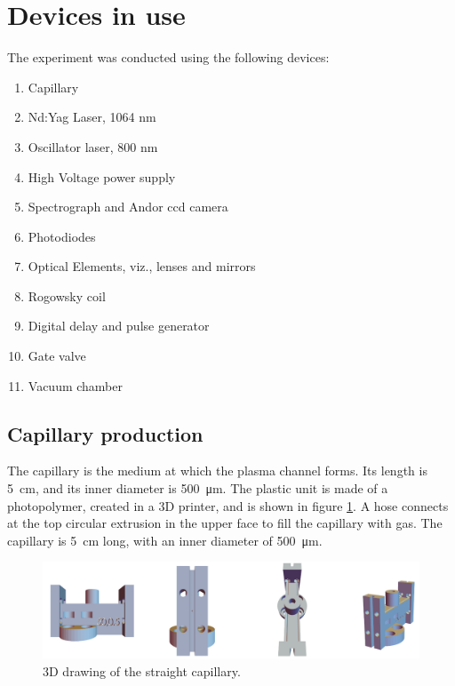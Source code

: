 \documentclass[justified,nofonts,nobib,openany]{tufte-book}
\begin{document}
	\section{Devices in use}\label{sec:devices}
The experiment was conducted using the following devices:
\begin{enumerate}
    \item Capillary
    \item Nd:Yag Laser, 1064 nm
    \item Oscillator laser, 800 nm
    \item High Voltage power supply
    \item Spectrograph and Andor ccd camera
    \item Photodiodes
    \item Optical Elements, viz., lenses and mirrors
    \item Rogowsky coil
    \item Digital delay and pulse generator
    \item Gate valve
    \item Vacuum chamber
\end{enumerate}
\subsection{Capillary production}
The capillary is the medium at which the plasma channel forms. Its length is \SI{5}{\cm}, and its inner diameter is \SI{500}{\um}. The plastic unit is made of a photopolymer, created in a 3D printer, and is shown in figure \ref{fig:onecapillaryCAD}. A hose connects at the top circular extrusion in the upper face to fill the capillary with gas. The capillary is \SI{5}{\cm} long, with an inner diameter of \SI{500}{\um}.
\begin{figure}[b]
    \centering
    \includegraphics[width=\textwidth]{figures/onecapillary_cad.png}
    \caption{3D drawing of the straight capillary.}
    \label{fig:onecapillaryCAD}
\end{figure}
\end{document}
